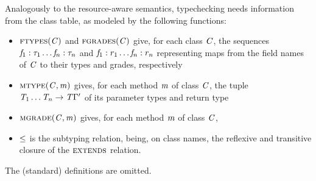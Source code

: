 Analogously to the resource-aware semantics, typechecking needs information from the class table, as modeled by the following functions:
\begin{itemize}
\item $\textsc{ftypes}(\mathit{C})$ and $\textsc{fgrades}(\mathit{C})$ give, for each class $\mathit{C}$, the sequences $\mathit{f}_1:\tau_1 \ldots \mathit{f}_n:\tau_n$ and $\mathit{f}_1:r_1\ldots\mathit{f}_n:r_n$ representing maps from the field names of $\mathit{C}$ to their types and grades, respectively
\item  $\textsc{mtype}(\mathit{C},\mathit{m})$ gives, for each method $\mathit{m}$ of class $\mathit{C}$, the tuple $\mathit{T}_1\ldots\mathit{T}_n\rightarrow\mathit{T}{\Gamma'}$ of its parameter types and return type
\item $\textsc{mgrade}(\mathit{C},\mathit{m})$ gives, for each method $\mathit{m}$ of class $\mathit{C}$, 
\item $\leq$ is the subtyping relation, being, on class names, the reflexive and transitive closure of the $\textsc{extends}$ relation. 
\end{itemize}
The (standard) definitions are omitted.

